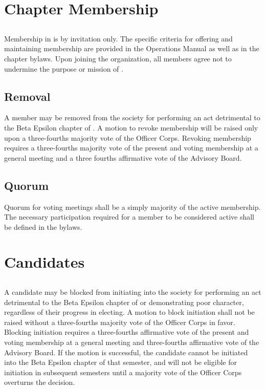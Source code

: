 \chapter{Chapter Membership}\label{sec:membership}


\section{}
Membership in \hkn is by invitation only. The specific criteria for offering and maintaining membership are provided in the \hkn Operations Manual as well as in the chapter bylaws. Upon joining the organization, all members agree not to undermine the purpose or mission of \hkn.

\section{Removal}
A member may be removed from the society for performing an act detrimental to the Beta Epsilon chapter of \hkn. A motion to revoke membership will be raised only upon a three-fourths majority vote of the Officer Corps. Revoking membership requires a three-fourths majority vote of the present and voting membership at a general meeting and a three fourths affirmative vote of the Advisory Board.

\section{Quorum}
 Quorum for voting meetings shall be a simply majority of the active membership. The necessary participation required for a member to be considered active shall be defined in the bylaws.


\chapter{Candidates}\label{sec:candidates}

\section{}
A candidate may be blocked from initiating into the society for performing an act detrimental to the Beta Epsilon chapter of \hkn or demonstrating poor character, regardless of their progress in electing. A motion to block initiation shall not be raised without a three-fourths majority vote of the Officer Corps in favor. Blocking initiation requires a three-fourths affirmative vote of the present and voting membership at a general meeting and three-fourths affirmative vote of the Advisory Board. If the motion is successful, the candidate cannot be initiated into the Beta Epsilon chapter of \hkn that semester, and will not be eligible for initiation  in subsequent semesters until a majority vote of the Officer Corps overturns the decision.


